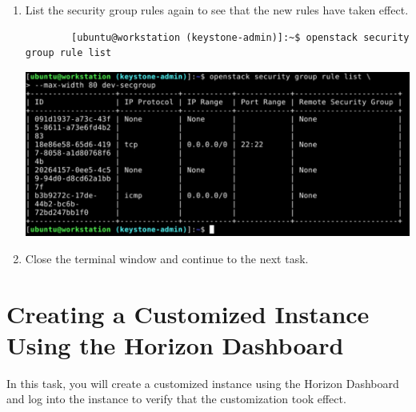 \documentclass[letterpaper, 12pt]{article}
\begin{document}
\begin{enumerate}
    \item List the security group rules again to see that the new rules have taken effect.
    \begin{lstlisting}
        [ubuntu@workstation (keystone-admin)]:~$ openstack security group rule list
    \end{lstlisting}

    \begin{center}
        \includegraphics[width=\linewidth]{images/part1/step29.png}
    \end{center}

    \item Close the terminal window and continue to the next task.
\end{enumerate}

\section{Creating a Customized Instance Using the Horizon Dashboard}
\label{sec:creating_a_customized_instance_using_the_horizon_dashboard}
In this task, you will create a customized instance using the Horizon Dashboard and log into the instance to verify that the customization took effect.
\end{document}
